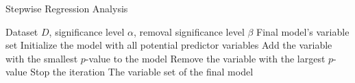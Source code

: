 \documentclass{article}
\begin{document}
	
	\begin{algorithm}
		\caption{Stepwise Regression Analysis}
		\begin{algorithmic}[1]
			\Require Dataset $D$, significance level $\alpha$, removal significance level $\beta$
			\Ensure Final model's variable set
			\State Initialize the model with all potential predictor variables
			\State Add the variable with the smallest $p$-value to the model
			\Else
			\State Remove the variable with the largest $p$-value
			\Else
			\State Stop the iteration
			\EndIf
			\EndIf
			\EndWhile
			\State \Return The variable set of the final model
		\end{algorithmic}
	\end{algorithm}
	
\end{document}
